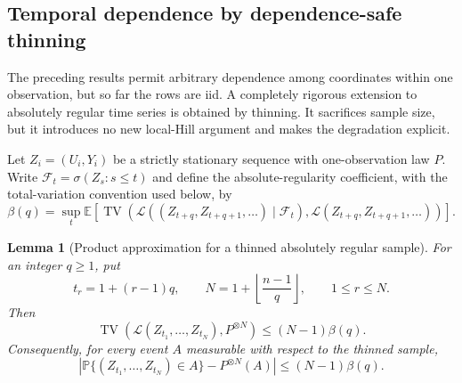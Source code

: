 \documentclass[11pt]{article}
\newtheorem{lemma}[theorem]{Lemma}
\theoremstyle{remark}
\newcommand{\Pp}{\mathbb P}
\newcommand{\E}{\mathbb E}
\newcommand{\TV}{\operatorname{TV}}
\begin{document}
\subsection{Temporal dependence by dependence-safe thinning}

The preceding results permit arbitrary dependence among coordinates within one
observation, but so far the rows are iid.  A completely rigorous extension to
absolutely regular time series is obtained by thinning.  It sacrifices sample
size, but it introduces no new local-Hill argument and makes the degradation
explicit.

Let $Z_i=(U_i,Y_i)$ be a strictly stationary sequence with one-observation law
$P$.  Write $\mathcal F_t=\sigma(Z_s:s\le t)$ and define the absolute-regularity
coefficient, with the total-variation convention used below, by
\begin{equation}
 \beta(q)=\sup_t
 \E\left[
  \TV\left(
   \mathcal L((Z_{t+q},Z_{t+q+1},\ldots)\mid\mathcal F_t),
   \mathcal L(Z_{t+q},Z_{t+q+1},\ldots)
  \right)
 \right].
 \label{eq:w3-beta}
\end{equation}

\begin{lemma}[Product approximation for a thinned absolutely regular sample]
\label{lem:w3-beta-thinning}
For an integer $q\ge1$, put
\begin{equation}
 t_r=1+(r-1)q,
 \qquad
 N=1+\left\lfloor\frac{n-1}{q}\right\rfloor,
 \qquad 1\le r\le N.
 \label{eq:w3-thinned-indices}
\end{equation}
Then
\begin{equation}
 \TV\left(
  \mathcal L(Z_{t_1},\ldots,Z_{t_N}),
  P^{\otimes N}
 \right)
 \le (N-1)\beta(q).
 \label{eq:w3-product-TV}
\end{equation}
Consequently, for every event $A$ measurable with respect to the thinned
sample,
\begin{equation}
 \left|
 \Pp\{(Z_{t_1},\ldots,Z_{t_N})\in A\}
 -P^{\otimes N}(A)
 \right|
 \le(N-1)\beta(q).
 \label{eq:w3-event-transfer}
\end{equation}
\end{lemma}
\end{document}
